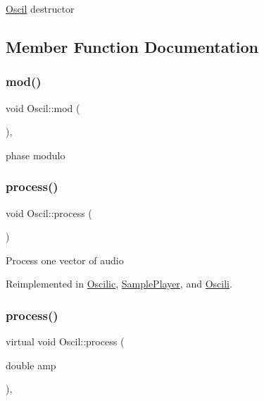 \hyperlink{class_oscil}{Oscil} destructor 

\subsection{Member Function Documentation}
\mbox{\label{class_oscil_a2dc5570e853d1364f753ff88f62d4e64}} 
\subsubsection{\texorpdfstring{mod()}{mod()}}
{\footnotesize\ttfamily void Oscil\+::mod (\begin{DoxyParamCaption}{ }\end{DoxyParamCaption})\hspace{0.3cm}{\ttfamily [inline]}, {\ttfamily [protected]}}

phase modulo \mbox{\label{class_oscil_a0e658a6f1b494286a783ce63e95f48ba}} 
\subsubsection{\texorpdfstring{process()}{process()}\hspace{0.1cm}{\footnotesize\ttfamily [1/3]}}
{\footnotesize\ttfamily void Oscil\+::process (\begin{DoxyParamCaption}{ }\end{DoxyParamCaption})\hspace{0.3cm}{\ttfamily [virtual]}}

Process one vector of audio 

Reimplemented in \hyperlink{class_oscilic_adcff5c6c3fd5a4da4bc76e05091d6dda}{Oscilic}, \hyperlink{class_sample_player_a263ee55c5d334486bc57956458a64713}{Sample\+Player}, and \hyperlink{class_oscili_a2571464f3b4874c3ca691061e8db7d32}{Oscili}.

\mbox{\label{class_oscil_a7ed04cfd228e849ddf95d09ea0aee8c2}} 
\subsubsection{\texorpdfstring{process()}{process()}\hspace{0.1cm}{\footnotesize\ttfamily [2/3]}}
{\footnotesize\ttfamily virtual void Oscil\+::process (\begin{DoxyParamCaption}\item[{double}]{amp }\end{DoxyParamCaption})\hspace{0.3cm}{\ttfamily [inline]}, {\ttfamily [virtual]}}

